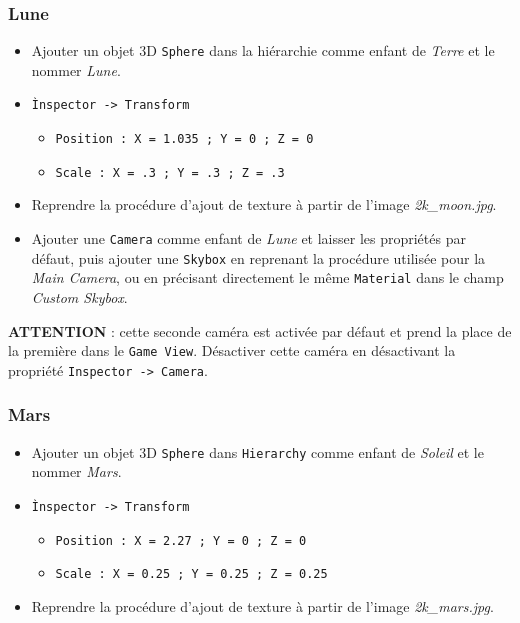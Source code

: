 \documentclass[a4paper,10pt]{article}
\newenvironment{solution}%
{\begin{tcolorbox}[breakable,colback=red!5!white,colframe=red!75!black,title=Solution]}%
{\end{tcolorbox}}
\begin{document}
\begin{solution}
\subsubsection{Lune}
\begin{itemize}
	\item Ajouter un objet 3D \texttt{Sphere} dans la hiérarchie comme enfant de \textit{Terre} et le nommer \textit{Lune}.
	\item \texttt{Ìnspector -> Transform}
	\begin{itemize}
		\item \texttt{Position : X = 1.035 ; Y = 0 ; Z = 0  }
		\item  \texttt{Scale : X = .3 ; Y = .3 ; Z = .3}
	\end{itemize}
	\item Reprendre la procédure d'ajout de texture à partir de l'image \textit{2k\_moon.jpg}.
	\item Ajouter une \texttt{Camera} comme enfant de \textit{Lune} et laisser les propriétés par défaut, puis ajouter une \texttt{Skybox} en reprenant la procédure utilisée pour la \textit{Main Camera}, ou en précisant directement le même \texttt{Material} dans le champ \textit{Custom Skybox}.
\end{itemize}
	\textbf{ATTENTION} : cette seconde caméra est activée par défaut et prend la place de la première dans le \texttt{Game View}. Désactiver cette caméra en désactivant la propriété \texttt{Inspector -> Camera}.

\subsubsection{Mars}
\begin{itemize}
	\item  Ajouter un objet 3D \texttt{Sphere} dans \texttt{Hierarchy} comme enfant de \textit{Soleil} et le nommer \textit{Mars}.
	\item \texttt{Ìnspector -> Transform}
	\begin{itemize}
		\item \texttt{Position : X = 2.27 ; Y = 0 ; Z = 0 }
		\item \texttt{Scale : X = 0.25 ; Y = 0.25 ; Z = 0.25} 
	\end{itemize}
	
	\item Reprendre la procédure d'ajout de texture à partir de l'image \textit{2k\_mars.jpg}.
\end{itemize}


\end{solution}
\end{document}
